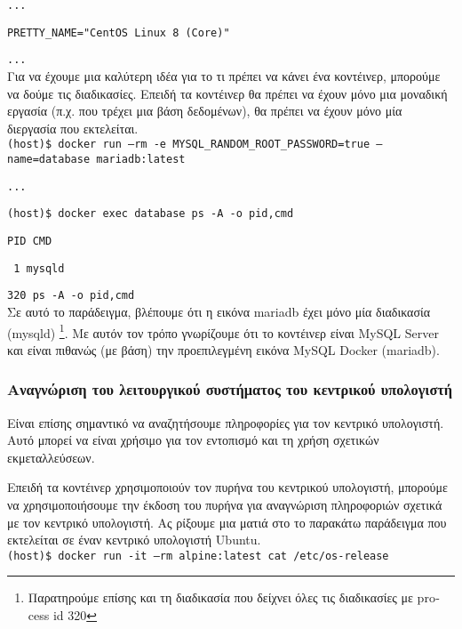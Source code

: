 \texttt{\textlatin{...}}

\texttt{\textlatin{PRETTY\_NAME="CentOS Linux 8 (Core)"}}

\texttt{\textlatin{...}} \\

Για να έχουμε μια καλύτερη ιδέα για το τι πρέπει να κάνει ένα κοντέινερ,
μπορούμε να δούμε τις διαδικασίες. Επειδή τα κοντέινερ θα πρέπει να έχουν μόνο
μια μοναδική εργασία (π.χ. που τρέχει μια βάση δεδομένων), θα πρέπει να έχουν
μόνο μία διεργασία που εκτελείται. \\

\texttt{\textlatin{(host)\$ docker run --rm -e MYSQL\_RANDOM\_ROOT\_PASSWORD=true --name=database mariadb:latest}}

\texttt{\textlatin{...}}

\texttt{\textlatin{(host)\$ docker exec database ps -A -o pid,cmd}}

\texttt{\textlatin{PID CMD}}

\texttt{\textlatin{   1 mysqld}}

\texttt{\textlatin{320 ps -A -o pid,cmd}} \\


Σε αυτό το παράδειγμα, βλέπουμε ότι η εικόνα \textlatin{mariadb} έχει μόνο μία
διαδικασία \textlatin{(mysqld)} \footnote{Παρατηρούμε επίσης και τη διαδικασία
που δείχνει όλες τις διαδικασίες με \textlatin{process id 320}}. Με αυτόν τον
τρόπο γνωρίζουμε ότι το κοντέινερ είναι \textlatin{MySQL Server} και είναι
πιθανώς (με βάση) την προεπιλεγμένη εικόνα \textlatin{MySQL Docker (mariadb)}.

\subsubsection{Αναγνώριση του λειτουργικού συστήματος του κεντρικού υπολογιστή}

Είναι επίσης σημαντικό να αναζητήσουμε πληροφορίες για τον κεντρικό υπολογιστή.
Αυτό μπορεί να είναι χρήσιμο για τον εντοπισμό και τη χρήση σχετικών
εκμεταλλεύσεων.

Επειδή τα κοντέινερ χρησιμοποιούν τον πυρήνα του κεντρικού υπολογιστή, μπορούμε
να χρησιμοποιήσουμε την έκδοση του πυρήνα για αναγνώριση πληροφοριών σχετικά με
τον κεντρικό υπολογιστή. Ας ρίξουμε μια ματιά στο το παρακάτω παράδειγμα που
εκτελείται σε έναν κεντρικό υπολογιστή \textlatin{Ubuntu}. \\

\texttt{\textlatin{(host)\$ docker run -it --rm alpine:latest cat /etc/os-release}}

